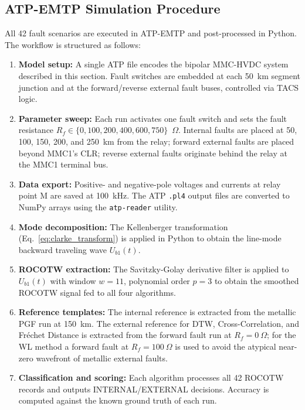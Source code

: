 \documentclass[journal]{IEEEtran}
\begin{document}
\subsection{ATP-EMTP Simulation Procedure}
\label{subsec:atp_procedure}

All 42 fault scenarios are executed in ATP-EMTP and post-processed in Python. The workflow is structured as follows:

\begin{enumerate}
    \item \textbf{Model setup:} A single ATP file encodes the bipolar MMC-HVDC system described in this section. Fault switches are embedded at each 50~km segment junction and at the forward/reverse external fault buses, controlled via TACS logic.

    \item \textbf{Parameter sweep:} Each run activates one fault switch and sets the fault resistance $R_f \in \{0, 100, 200, 400, 600, 750\}$~$\Omega$. Internal faults are placed at 50, 100, 150, 200, and 250~km from the relay; forward external faults are placed beyond MMC1's CLR; reverse external faults originate behind the relay at the MMC1 terminal bus.

    \item \textbf{Data export:} Positive- and negative-pole voltages and currents at relay point M are saved at 100~kHz. The ATP \texttt{.pl4} output files are converted to NumPy arrays using the \texttt{atp-reader} utility.

    \item \textbf{Mode decomposition:} The Kellenberger transformation (Eq.~\eqref{eq:clarke_transform}) is applied in Python to obtain the line-mode backward traveling wave $U_{b1}(t)$.

    \item \textbf{ROCOTW extraction:} The Savitzky-Golay derivative filter is applied to $U_{b1}(t)$ with window $w = 11$, polynomial order $p = 3$ to obtain the smoothed ROCOTW signal fed to all four algorithms.

    \item \textbf{Reference templates:} The internal reference is extracted from the metallic PGF run at 150~km. The external reference for DTW, Cross-Correlation, and Fréchet Distance is extracted from the forward fault run at $R_f = 0~\Omega$; for the WL method a forward fault at $R_f = 100~\Omega$ is used to avoid the atypical near-zero wavefront of metallic external faults.

    \item \textbf{Classification and scoring:} Each algorithm processes all 42 ROCOTW records and outputs INTERNAL/EXTERNAL decisions. Accuracy is computed against the known ground truth of each run.
\end{enumerate}
\end{document}
